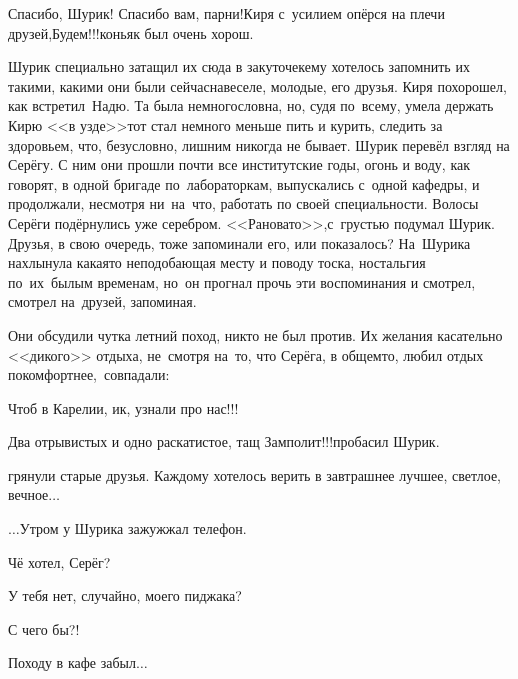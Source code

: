 {\diagdash Спасибо, Шурик! Спасибо вам, парни!\mdash Киря с~усилием опёрся на плечи друзей,\mdash Будем!!!\mdash коньяк был очень хорош.

Шурик специально затащил их сюда в закуточек\mdash ему хотелось запомнить их такими, какими они были сейчас\mdash навеселе, молодые, его друзья. Киря похорошел, как встретил~Надю. Та была немногословна, но, судя по~всему, умела держать Кирю <<в узде>>\mdash тот стал немного меньше пить и курить, следить за здоровьем, что, безусловно, лишним никогда не бывает. Шурик перевёл взгляд на Серёгу. С ним они прошли почти все институтские годы, огонь и воду, как говорят, в одной бригаде по~лабораторкам, выпускались с~одной кафедры, и продолжали, несмотря ни~на~что, работать по своей специальности. Волосы Серёги подёрнулись уже серебром. <<Рановато>>,\mdash с~грустью подумал Шурик. Друзья, в свою очередь, тоже запоминали его, или показалось? На~Шурика нахлынула какая\sdash то неподобающая месту и поводу тоска, ностальгия по~их~былым временам, но~он прогнал прочь эти воспоминания и смотрел, смотрел на~друзей, запоминая.  

Они обсудили чутка летний поход, никто не был против. Их желания касательно <<дикого>> отдыха, не~смотря на~то, что Серёга, в общем\sdash то, любил отдых покомфортнее,~совпадали:

\diagdash Чтоб в Карелии, ик, узнали про нас!!!%

\diagdash Два отрывистых и одно раскатистое, тащ Замполит!!!\mdash пробасил Шурик.

\mdash грянули старые друзья. Каждому хотелось верить в завтрашнее лучшее, светлое, вечное$\ldots$

\vspace{2.0cm}
$\ldots$Утром у Шурика зажужжал телефон. 

\diagdash Чё хотел, Серёг?

\diagdash У тебя нет, случайно, моего пиджака?

\diagdash С чего бы?!

\diagdash Походу в кафе забыл$\ldots$

\begin{center}
\end{center}
}